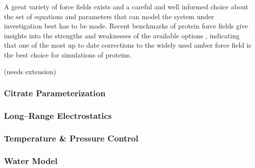 \documentclass[english, a4paper, 12pt, titlepage, draft]{article}
\begin{document}
A great variety of force fields exists and a careful and well informed choice about the set of equations and parameters that can model the system under investigation best has to be made.
Recent benchmarks of protein force fields give insights into the strengths and weaknesses of the available options \cite{proteinFF}, indicating that one of the most up to date corrections to the widely used amber force field \cite{amber99sb-ildn-nmr} is the best choice for simulations of proteins.

(needs extension)


\subsubsection{Citrate Parameterization}


\subsubsection{Long--Range Electrostatics}


\subsubsection{Temperature \& Pressure Control}
\label{sec:tempPressControl}


\subsubsection{Water Model}




%
%
 
\end{document}
